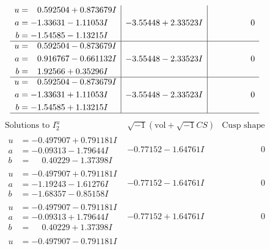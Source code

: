 \documentclass[1p]{elsarticle_modified}
\theoremstyle{definition}
\newcommand{\I}{\sqrt{-1}}
\begin{document}
$$\begin{array}{c|c|c}
\begin{aligned}
u &= \phantom{-}0.592504 + 0.873679 I \\
a &= -1.33631 - 1.11053 I \\
b &= -1.54585 - 1.13215 I\end{aligned}
 & -3.55448 + 2.33523 I & \phantom{-0.000000 } 0 \\ \hline\begin{aligned}
u &= \phantom{-}0.592504 - 0.873679 I \\
a &= \phantom{-}0.916767 - 0.661132 I \\
b &= \phantom{-}1.92566 + 0.35296 I\end{aligned}
 & -3.55448 - 2.33523 I & \phantom{-0.000000 } 0 \\ \hline\begin{aligned}
u &= \phantom{-}0.592504 - 0.873679 I \\
a &= -1.33631 + 1.11053 I \\
b &= -1.54585 + 1.13215 I\end{aligned}
 & -3.55448 - 2.33523 I & \phantom{-0.000000 } 0\\
 \hline 
 \end{array}$$\newpage$$\begin{array}{c|c|c}  
\text{Solutions to }I^u_{2}& \I (\text{vol} + \sqrt{-1}CS) & \text{Cusp shape}\\
 \hline 
\begin{aligned}
u &= -0.497907 + 0.791181 I \\
a &= -0.09313 - 1.79644 I \\
b &= \phantom{-}0.40229 - 1.37398 I\end{aligned}
 & -0.77152 - 1.64761 I & \phantom{-0.000000 } 0 \\ \hline\begin{aligned}
u &= -0.497907 + 0.791181 I \\
a &= -1.19243 - 1.61276 I \\
b &= -1.68357 - 0.85158 I\end{aligned}
 & -0.77152 - 1.64761 I & \phantom{-0.000000 } 0 \\ \hline\begin{aligned}
u &= -0.497907 - 0.791181 I \\
a &= -0.09313 + 1.79644 I \\
b &= \phantom{-}0.40229 + 1.37398 I\end{aligned}
 & -0.77152 + 1.64761 I & \phantom{-0.000000 } 0 \\ \hline\begin{aligned}
u &= -0.497907 - 0.791181 I \\

\end{aligned}
\end{array}$$
\end{document}
